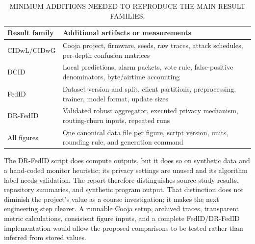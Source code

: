 \documentclass[conference]{IEEEtran}
\begin{document}
\begin{table}[htbp]
\centering
\caption{MINIMUM ADDITIONS NEEDED TO REPRODUCE THE MAIN RESULT FAMILIES.}
\label{tab:repro_additions}
\begin{tabular}{p{2.2cm}p{5.6cm}}
\toprule
\textbf{Result family} & \textbf{Additional artifacts or measurements} \\
\midrule
CIDwL/CIDwG & Cooja project, firmware, seeds, raw traces, attack schedules, per-depth confusion matrices \\
DCID & Local predictions, alarm packets, vote rule, false-positive denominators, byte/airtime accounting \\
FedID & Dataset version and split, client partitions, preprocessing, trainer, model format, update sizes \\
DR-FedID & Validated robust aggregator, executed privacy mechanism, routing-churn inputs, repeated runs \\
All figures & One canonical data file per figure, script version, units, rounding rule, and generation command \\
\bottomrule
\end{tabular}
\end{table}

The DR-FedID script does compute outputs, but it does so on synthetic data and a hand-coded monitor heuristic; its privacy settings are unused and its algorithm label needs validation. The report therefore distinguishes source-study results, repository summaries, and synthetic program output. That distinction does not diminish the project's value as a course investigation; it makes the next engineering step clearer. A runnable Cooja setup, archived traces, transparent metric calculations, consistent figure inputs, and a complete FedID/DR-FedID implementation would allow the proposed comparisons to be tested rather than inferred from stored values.



\end{document}
